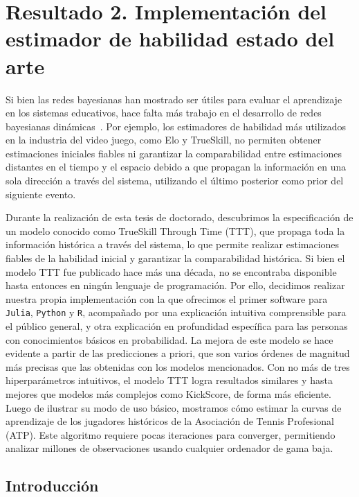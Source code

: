 \documentclass[a4paper,11pt]{book}
\theoremstyle{definition}
\begin{document}
\chapter{Resultado 2. Implementaci\'on del estimador de habilidad estado del arte} \label{ch_ttt}

Si bien las redes bayesianas han mostrado ser \'utiles para evaluar el aprendizaje en los sistemas educativos, hace falta m\'as trabajo en el desarrollo de redes bayesianas din\'amicas~\cite{Almond2015}.
%
Por ejemplo, los estimadores de habilidad m\'as utilizados en la industria del video juego, como Elo y TrueSkill, no permiten obtener estimaciones iniciales fiables ni garantizar la comparabilidad entre estimaciones distantes en el tiempo y el espacio debido a que propagan la informaci\'on en una sola direcci\'on a trav\'es del sistema, utilizando el \'ultimo posterior como prior del siguiente evento.

Durante la realizaci\'on de esta tesis de doctorado, descubrimos la especificaci\'on de un modelo conocido como TrueSkill Through Time (TTT), que propaga toda la informaci\'on hist\'orica a trav\'es del sistema, lo que permite realizar estimaciones fiables de la habilidad inicial y garantizar la comparabilidad hist\'orica.
%
Si bien el modelo TTT fue publicado hace m\'as una d\'ecada, no se encontraba disponible hasta entonces en ning\'un lenguaje de programaci\'on.
%
Por ello, decidimos realizar nuestra propia implementaci\'on con la que ofrecimos el primer software para \texttt{Julia}, \texttt{Python} y \texttt{R}, acompa\~nado por una explicaci\'on intuitiva comprensible para el p\'ublico general, y otra explicaci\'on en profundidad espec\'ifica para las personas con conocimientos b\'asicos en probabilidad.
%
La mejora de este modelo se hace evidente a partir de las predicciones a priori, que son varios \'ordenes de magnitud m\'as precisas que las obtenidas con los modelos mencionados.
%
Con no m\'as de tres hiperpar\'ametros intuitivos, el modelo TTT logra resultados similares y hasta mejores que modelos m\'as complejos como KickScore, de forma m\'as eficiente.
%
Luego de ilustrar su modo de uso b\'asico, mostramos c\'omo estimar la curvas de aprendizaje de los jugadores hist\'oricos de la Asociaci\'on de Tennis Profesional (ATP).
%
Este algoritmo requiere pocas iteraciones para converger, permitiendo analizar millones de observaciones usando cualquier ordenador de gama baja.

\section{Introducci\'on} \label{sec:intro}
\end{document}
